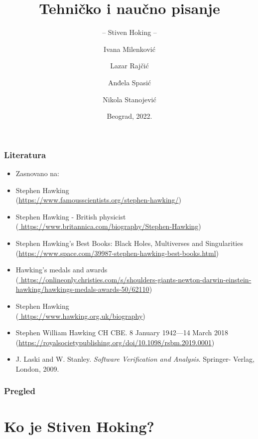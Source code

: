 \documentclass{beamer}
\title{Tehničko i naučno pisanje}
\subtitle{-- Stiven Hoking --}
\author{ Ivana Milenković\\ \and Lazar Rajčić\\ \and Anđela Spasić\\ \and Nikola Stanojević }
\institute{Matematički fakultet\\Univerzitet u Beogradu}
\date{
	\footnotesize{Beograd, 2022.}	
}
\begin{document}
\begin{frame}
	\thispagestyle{empty}
	\titlepage
\end{frame}

\addtocounter{framenumber}{-1}

\begin{frame}[fragile]\frametitle{Literatura}
	\begin{itemize} \fontsize{9}{6}\selectfont
		\item Zasnovano na:\\

	\item Stephen Hawking
	     \\ (\url{https://www.famousscientists.org/stephen-hawking/})
        \item  Stephen Hawking - British physicist
           \\ (\url{ https://www.britannica.com/biography/Stephen-Hawking})
        \item Stephen Hawking's Best Books: Black Holes, Multiverses and Singularities
           \\(\url{https://www.space.com/39987-stephen-hawking-best-books.html})
        \item Hawking's medals and awards
            \\(\url{ https://onlineonly.christies.com/s/shoulders-giants-newton-darwin-einstein-hawking/hawkings-medals-awards-50/62110})
       \item  Stephen Hawking
            \\(\url{ https://www.hawking.org.uk/biography})
        \item Stephen William Hawking CH CBE. 8 January 1942—14 March 2018
           \\ (\url{https://royalsocietypublishing.org/doi/10.1098/rsbm.2019.0001})
        \item J. Laski and W. Stanley. \emph{Software Verification and Analysis}. Springer- Verlag, London, 2009.
     \fontsize{6pt}{1pt}\selectfont
	\end{itemize}
\end{frame}

\begin{frame} \fontsize{9}{6}\selectfont
	\frametitle{Pregled}
	\tableofcontents[hidesubsections] 
\end{frame}
\section{Ko je Stiven Hoking?}
\end{document}
